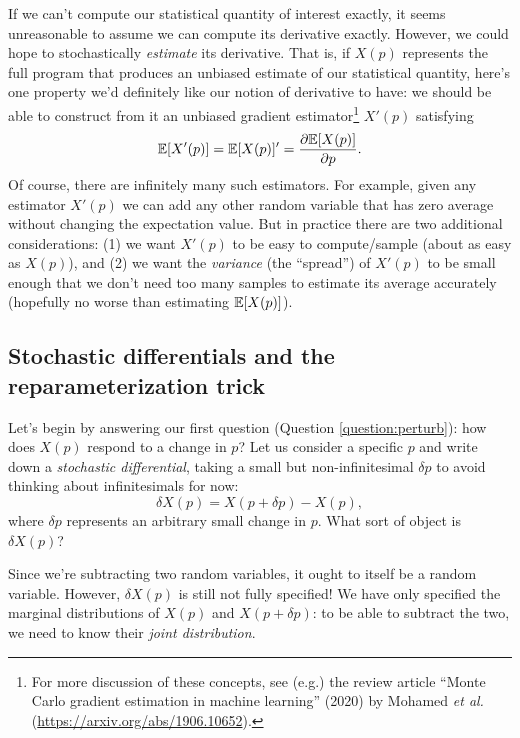 If we can't compute our statistical quantity of interest exactly, it seems unreasonable to assume we
can compute its derivative exactly. However, we could hope to stochastically \emph{estimate} its derivative.
That is, if $X(p)$ represents the full program that produces an unbiased estimate of our statistical quantity, 
here's one property we'd definitely like our notion of derivative to have: 
we should be able to construct from it an unbiased gradient estimator\footnote{For more discussion of these concepts, see (e.g.) the review article ``Monte Carlo gradient estimation in machine learning'' (2020) by Mohamed \textit{et al.} (\url{https://arxiv.org/abs/1906.10652}).} $X'(p)$ satisfying
\begin{equation}
    \mathbb E[X'(p)] = \mathbb E[X(p)]' = \frac{\partial \mathbb E[X(p)]}{\partial p}.
\end{equation}
Of course, there are infinitely many such estimators. For example, given any estimator $X'(p)$ we can add any other random variable that has zero average without changing the  expectation value. But in practice there are two additional considerations: (1) we want $X'(p)$ to be easy to compute/sample (about as easy as $X(p)$), and (2) we want the \emph{variance} (the ``spread'') of $X'(p)$ to be small enough that we don't need too many samples to estimate its average accurately (hopefully no worse than estimating $\mathbb E[X(p)]$).

\subsection{Stochastic differentials and the reparameterization trick}

Let's begin by answering our first question (Question \ref{question:perturb}): how does $X(p)$ respond to a change in $p$?
Let us consider a specific $p$ and write down a \emph{stochastic differential}, taking a small but non-infinitesimal $\delta p$ to avoid thinking about infinitesimals for now:
\begin{equation}
    \delta X(p) = X(p + \delta p) - X(p),
\end{equation}
where $\delta p$ represents an arbitrary small change in $p$.
What sort of object is $\delta X(p)$?

Since we're subtracting two random variables, it ought to itself be a random variable.
However, $\delta X(p)$ is still not fully specified! We have only specified 
the marginal distributions of $X(p)$ and $X(p+\delta p)$: to be able to subtract the two,
we need to know their \emph{joint distribution}.


